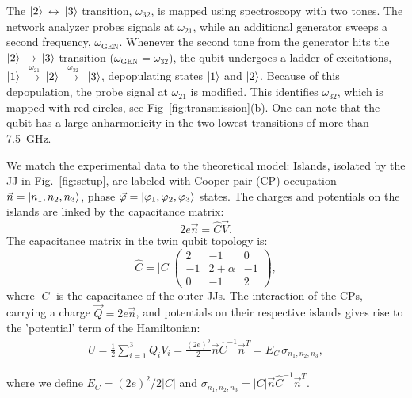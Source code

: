 \documentclass[%
reprint,
superscriptaddress,
bibnotes,
amsmath,
amssymb,
aps,
showkeys,
prb,
]{revtex4-2}
\newcommand{\iket}[1]{\ensuremath{\Ket{#1}}}
\newcommand{\ira}{\ensuremath{\,\rightarrow\,}}
\newcommand{\ilra}{\ensuremath{\,\leftrightarrow\,}}
\newcommand{\iabs}[1]{\ensuremath{\left|#1\right|}}
\newcommand{\iratext}[1]{\ensuremath{\,\xrightarrow{\text{#1}}\,}}
\begin{document}
The  \iket{2}\ilra\iket{3}  transition,  $\omega_{32}$,   is  mapped  using
spectroscopy with two tones. The network  analyzer probes  signals at  $ \omega_{21}  $, while  an
additional generator  sweeps a second  frequency, $ \omega_{\text{GEN}}  $.  Whenever
the second tone from the generator hits the \iket{2}\ira\iket{3} transition
($\omega_{\text{GEN}}  = \omega_{32}  $), the  qubit  undergoes a  ladder of  excitations,
\iket{1}  \iratext{$\omega_{21}$}\iket{2}  \iratext{$\omega_{32}$} \iket{3},  depopulating
states \iket{1} and \iket{2}.  Because of this depopulation, the probe signal at $\omega_{21}$ is
modified.
This identifies  $\omega_{32}$, which  is mapped  with red  circles, see Fig~\ref{fig:transmission}(b).
One can note that the qubit has a large anharmonicity in the two lowest transitions of more than 7.5~GHz.

We match the  experimental data to the theoretical model: Islands,  isolated by the
JJ  in  Fig.~\ref{fig:setup},  are  labeled with  Cooper  pair  (CP)  occupation
$       \vec{n}      =       \iket{n_1,      n_2,       n_3}      $,       phase
$     \vec{\varphi}     =     \iket{\varphi_1,     \varphi_2,     \varphi_3}     $  states.  The charges and potentials on
the islands are linked by the capacitance matrix:
\begin{equation}
  \label{eq:link}
  2e\vec{n} = \hat{C}\vec{V}.
\end{equation}
The capacitance matrix in the twin qubit topology is:
\begin{equation}
  \hat{C} = \iabs{C} \begin{pmatrix}
    2  &  -1  &  0\\
    -1  &  2  +  \alpha  &  -1\\
    0  &  -1  & 2
  \end{pmatrix},
  \label{eq:capac}
\end{equation}
where \iabs{C}  is the capacitance of the outer  JJs.  The interaction
of the  CPs, carrying a  charge $ \vec{Q}=2e\vec{n}  $, and potentials  on their
respective islands gives rise to the 'potential' term of the Hamiltonian:
\begin{equation}\label{eq:potential}
  \begin{aligned}
    U = \frac{1}{2}\sum_{i=1}^{3}Q_iV_i =
    \frac{(2e)^2}{2}\vec{n}\hat{C}^{-1}\vec{n}^{T} = E_C\,\sigma_{n_1, n_2, n_3},
  \end{aligned}
\end{equation}

\noindent where we define $ E_{C}={(2e)^{2}}/{2 \iabs{C} } $ and $\sigma_{n_1, n_2, n_3} = \iabs{C}\vec{n}\hat{C}^{-1}\vec{n}^{T}$.
\end{document}
